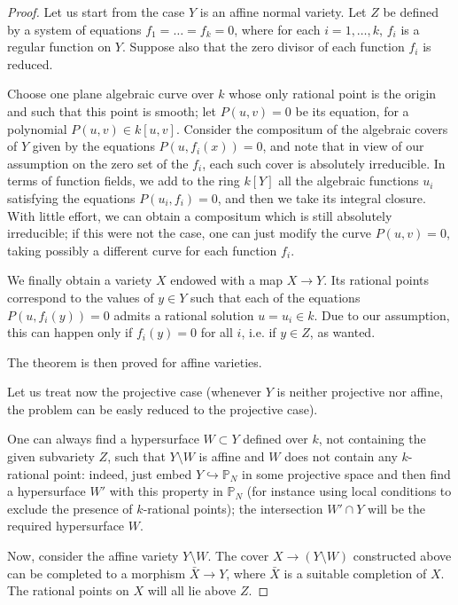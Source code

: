 \documentclass[leqno,12pt]{article} %
\def\P{{{\mathbb P}}}
\theoremstyle{plain} %
\theoremstyle{definition} %
\begin{document}
\begin{proof}
Let us start from the case $Y$ is an affine normal variety. Let $Z$ be defined by a system of equations $f_1=\ldots=f_k=0$, where for each $i=1,\ldots,k$, $f_i$ is a regular function on $Y$. Suppose also that the zero divisor of each function $f_i$ is reduced. 

Choose one plane algebraic curve  over $k$ whose only rational point is the origin and such that this point is smooth; let $P(u,v)=0$ be its equation, for a polynomial $P(u,v)\in k[u,v]$. Consider the compositum of the algebraic covers of $Y$ given by the equations $P(u,f_i(x))=0$, and note that in view of our assumption on the zero set of the $f_i$, each such cover is absolutely irreducible. In  terms of function fields, we add to the ring $k[Y]$ all the algebraic functions $u_i$ satisfying the equations $P(u_i,f_i)=0$, and then we take its integral closure. With little effort, we can obtain a compositum which is still absolutely irreducible; if this were not the case, one can just modify the curve $P(u,v)=0$, taking possibly a different curve for each function $f_i$. 

We finally obtain a variety $X$ endowed with a map $X\to Y$. Its rational points correspond to the values of $y\in Y$ such that each of the equations $P(u,f_i(y))=0$ admits a rational solution $u=u_i\in k$. Due to our assumption, this can happen only if $f_i(y)=0$ for all $i$, i.e. if $y\in Z$, as wanted.

The theorem is then proved for affine varieties.

Let us treat now the projective case (whenever $Y$ is neither projective nor affine, the problem can be easly reduced to the projective case).

One can always find a hypersurface $W\subset Y$ defined over $k$, not containing the given subvariety $Z$,  such that $Y \setminus  W$ is affine and $W$ does not contain any $k$-rational point: indeed, just embed $Y\hookrightarrow \P_N$ in some projective space and then find a hypersurface $W'$ with this property in $\P_N$ (for instance using local conditions to exclude the presence of $k$-rational points); the intersection $W'\cap Y$ will be the required hypersurface $W$. 

Now, consider the affine variety $Y\setminus W$. The cover $X\to (Y\setminus W)$ constructed above can be completed to a morphism $\bar{X}\to Y$, where $\bar{X}$ is a suitable completion of $X$. The rational points on $X$ will all lie above $Z$.

\end{proof}
\end{document}
